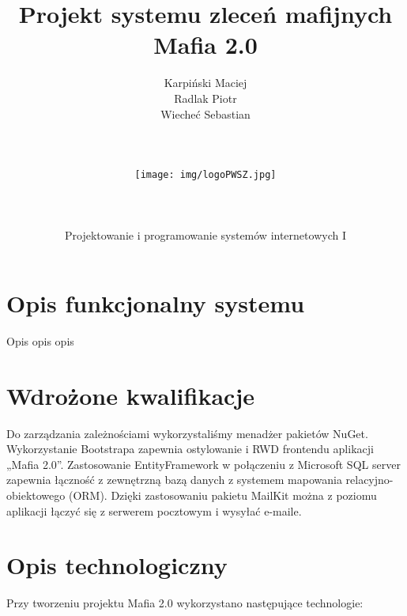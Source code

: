 \documentclass[12pt,a4paper]{article}
\author{Karpiński Maciej\\Radlak Piotr\\Wiecheć Sebastian\\\\\\\\\texttt{[image: img/logoPWSZ.jpg]}\\\\\\\\Projektowanie i programowanie systemów internetowych I}
\title{Projekt systemu zleceń mafijnych\\Mafia 2.0}
\begin{document}
	\maketitle
	\thispagestyle{empty}
	\clearpage

	\tableofcontents
	\newpage

	\section{Opis funkcjonalny systemu}
		Opis opis opis
	
	\section{Wdrożone kwalifikacje}
		
		Do zarządzania zależnościami wykorzystaliśmy menadżer pakietów NuGet.
		Wykorzystanie Bootstrapa zapewnia ostylowanie i RWD frontendu aplikacji „Mafia 2.0”.
		Zastosowanie EntityFramework w połączeniu z Microsoft SQL server zapewnia łączność z zewnętrzną bazą danych z systemem mapowania relacyjno-obiektowego (ORM).
		Dzięki zastosowaniu pakietu MailKit można z poziomu aplikacji łączyć się z serwerem pocztowym i wysyłać e-maile.
	
	\section{Opis technologiczny}
		Przy tworzeniu projektu Mafia 2.0 wykorzystano następujące technologie:
\end{document}
